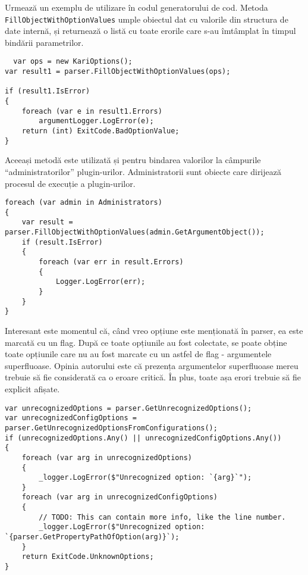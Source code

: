 \documentclass[a4paper,12pt]{report}
\begin{document}
Urmează un exemplu de utilizare în codul generatorului de cod.
Metoda \texttt{FillObjectWithOptionValues} umple obiectul dat cu valorile din structura de date internă, și returnează o listă cu toate erorile care s-au îmtâmplat în timpul bindării parametrilor. 



\begin{lstlisting}
  var ops = new KariOptions();
var result1 = parser.FillObjectWithOptionValues(ops);

if (result1.IsError)
{
    foreach (var e in result1.Errors)
        argumentLogger.LogError(e);
    return (int) ExitCode.BadOptionValue;
}
\end{lstlisting}

Aceeași metodă este utilizată și pentru bindarea valorilor la câmpurile ``administratorilor'' plugin-urilor.
Administratorii sunt obiecte care dirijează procesul de execuție a plugin-urilor.




\begin{lstlisting}
foreach (var admin in Administrators)
{
    var result = parser.FillObjectWithOptionValues(admin.GetArgumentObject());
    if (result.IsError)
    {
        foreach (var err in result.Errors)
        {
            Logger.LogError(err);
        }
    }
}
\end{lstlisting}

Interesant este momentul că, când vreo opțiune este menționată în parser, ea este marcată cu un flag.
După ce toate opțiunile au fost colectate, se poate obține toate opțiunile care nu au fost marcate cu un astfel de flag - argumentele superfluoase.
Opinia autorului este că prezența argumentelor superfluoase mereu trebuie să fie considerată ca o eroare critică.
În plus, toate așa erori trebuie să fie explicit afișate.



\begin{lstlisting}
var unrecognizedOptions = parser.GetUnrecognizedOptions();
var unrecognizedConfigOptions = parser.GetUnrecognizedOptionsFromConfigurations();
if (unrecognizedOptions.Any() || unrecognizedConfigOptions.Any())
{
    foreach (var arg in unrecognizedOptions)
    {
        _logger.LogError($"Unrecognized option: `{arg}`");
    }
    foreach (var arg in unrecognizedConfigOptions)
    {
        // TODO: This can contain more info, like the line number.
        _logger.LogError($"Unrecognized option: `{parser.GetPropertyPathOfOption(arg)}`);
    }
    return ExitCode.UnknownOptions;
}
\end{lstlisting}
\end{document}
